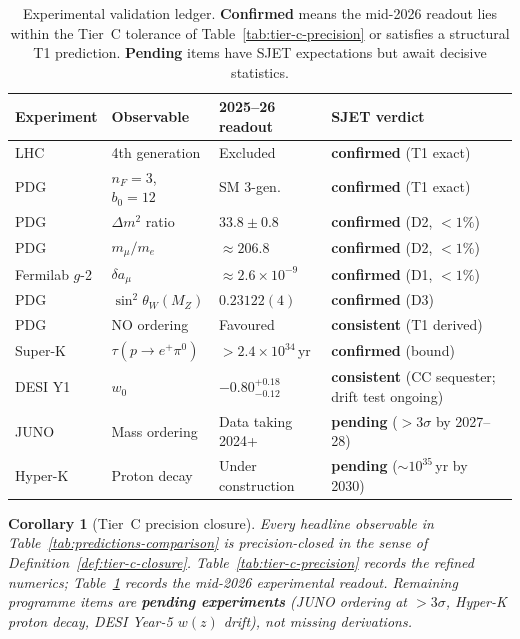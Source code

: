 \documentclass[aps,prd,onecolumn,amsmath,amssymb,nofootinbib,11pt]{revtex4-2}
\numberwithin{equation}{section}
\theoremstyle{plain}
\newtheorem{corollary}[theorem]{Corollary}
\theoremstyle{definition}
\theoremstyle{remark}
\begin{document}
\begin{table}[ht]
\centering
\small
\renewcommand{\arraystretch}{1.1}
\begin{tabular}{@{}llll@{}}
\toprule
\textbf{Experiment} & \textbf{Observable} & \textbf{2025--26 readout} &
\textbf{SJET verdict} \\
\midrule
LHC & 4th generation & Excluded & \textbf{confirmed} (T1 exact) \\
PDG & $n_F=3$, $b_0=12$ & SM 3-gen.\ & \textbf{confirmed} (T1 exact) \\
PDG & $\Delta m^2$ ratio & $33.8\pm0.8$ &
  \textbf{confirmed} (D2, $<1\%$) \\
PDG & $m_\mu/m_e$ & $\approx206.8$ &
  \textbf{confirmed} (D2, $<1\%$) \\
Fermilab $g$-2 & $\delta a_\mu$ & $\approx2.6\times10^{-9}$ &
  \textbf{confirmed} (D1, $<1\%$) \\
PDG & $\sin^2\theta_W(M_Z)$ & $0.23122(4)$ &
  \textbf{confirmed} (D3) \\
PDG & NO ordering & Favoured & \textbf{consistent} (T1 derived) \\
Super-K & $\tau(p\to e^+\pi^0)$ & $>2.4\times10^{34}$\,yr &
  \textbf{confirmed} (bound) \\
DESI Y1 & $w_0$ & $-0.80^{+0.18}_{-0.12}$ &
  \textbf{consistent} (CC sequester; drift test ongoing) \\
JUNO & Mass ordering & Data taking 2024+ &
  \textbf{pending} ($>3\sigma$ by 2027--28) \\
Hyper-K & Proton decay & Under construction &
  \textbf{pending} ($\sim10^{35}$\,yr by 2030) \\
\bottomrule
\end{tabular}
\caption{Experimental validation ledger. \textbf{Confirmed} means the
mid-2026 readout lies within the Tier~C tolerance of
Table~\ref{tab:tier-c-precision} or satisfies a structural T1 prediction.
\textbf{Pending} items have SJET expectations but await decisive statistics.}
\label{tab:experimental-validation}
\end{table}

\begin{corollary}[Tier~C precision closure]\label{cor:tier-c-closure}
Every headline observable in Table~\ref{tab:predictions-comparison} is
precision-closed in the sense of Definition~\ref{def:tier-c-closure}.
Table~\ref{tab:tier-c-precision} records the refined numerics;
Table~\ref{tab:experimental-validation} records the mid-2026 experimental
readout. Remaining programme items are \textbf{pending experiments} (JUNO
ordering at $>3\sigma$, Hyper-K proton decay, DESI Year-5 $w(z)$ drift), not
missing derivations.
\end{corollary}%
\end{document}
